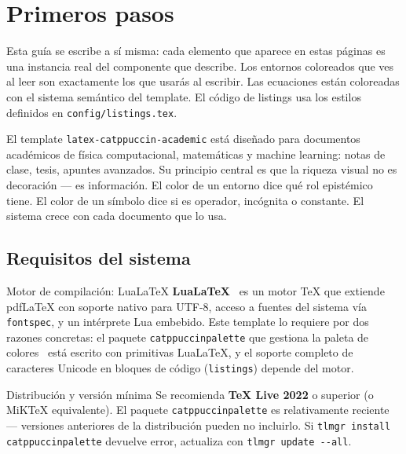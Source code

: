 \chapter{Primeros pasos}
\label{ch:primeros-pasos}

Esta guía se escribe a sí misma: cada elemento que aparece en estas páginas
es una instancia real del componente que describe. Los entornos coloreados
que ves al leer son exactamente los que usarás al escribir. Las ecuaciones
están coloreadas con el sistema semántico del template. El código de listings
usa los estilos definidos en \texttt{config/listings.tex}.

El template \texttt{latex-catppuccin-academic} está diseñado para documentos
académicos de física computacional, matemáticas y machine learning: notas
de clase, tesis, apuntes avanzados. Su principio central es que la riqueza
visual no es decoración --- es información. El color de un entorno dice qué
rol epistémico tiene. El color de un símbolo dice si es operador, incógnita
o constante. El sistema crece con cada documento que lo usa.

\section{Requisitos del sistema}
\label{sec:requisitos}

\begin{definicion}{Motor de compilación: LuaLaTeX}
\textbf{LuaLaTeX}~\cite{luatex2023} es un motor TeX que extiende pdfLaTeX
con soporte nativo para UTF-8, acceso a fuentes del sistema vía
\texttt{fontspec}, y un intérprete Lua embebido. Este template lo requiere
por dos razones concretas: el paquete \texttt{catppuccinpalette} que gestiona
la paleta de colores~\cite{catppuccin2021} está escrito con primitivas
LuaLaTeX, y el soporte completo de caracteres Unicode en bloques de código
(\texttt{listings}) depende del motor.
\end{definicion}

\begin{observacion}{Distribución y versión mínima}
Se recomienda \textbf{TeX Live 2022} o superior (o MiKTeX equivalente).
El paquete \texttt{catppuccinpalette} es relativamente reciente --- versiones
anteriores de la distribución pueden no incluirlo. Si
\texttt{tlmgr install catppuccinpalette} devuelve error, actualiza con
\texttt{tlmgr update -{}-all}.
\end{observacion}

